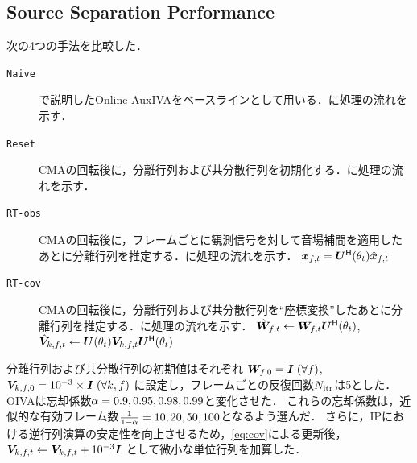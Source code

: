 \documentclass[sip,biber]{now-journal}
\begin{document}
\newcommand{\NaiveIVA}{\texttt{Naive}}
\newcommand{\ResetIVA}{\texttt{Reset}}
\newcommand{\RTCov}{\texttt{RT-cov}}
\newcommand{\RTObs}{\texttt{RT-obs}}
\subsection{Source Separation Performance}

次の4つの手法を比較した．
\begin{description}
  \item[\NaiveIVA] で説明したOnline AuxIVAをベースラインとして用いる．に処理の流れを示す．
  \item[\ResetIVA] CMAの回転後に，分離行列および共分散行列を初期化する．に処理の流れを示す．
  \item[\RTObs] CMAの回転後に，フレームごとに観測信号を対して音場補間を適用したあとに分離行列を推定する．に処理の流れを示す．
    $\Obs _{\ft} = \rotMat ^{\hermite} (\rotSpat _{\tframe}) \rot{\Obs} _{\ft}$
  \item[\RTCov] CMAの回転後に，分離行列および共分散行列を``座標変換''したあとに分離行列を推定する．に処理の流れを示す．
    $\rot{\Demix} _{\ft} \gets \Demix _{\ft} \rotMat ^{\hermite} (\rotSpat _{\tframe})$,\; $\rot{\cov} _{\src,\ft} \gets \rotMat (\rotSpat _{\tframe}) \cov _{\src,\ft} \rotMat ^{\hermite} (\rotSpat _{\tframe})$
\end{description}

分離行列および共分散行列の初期値はそれぞれ
$\bm{W} _{f,0} = \bm{I}\; (\forall f)$, $\bm{V} _{k,f,0} = 10^{-3}\times\bm{I}\; (\forall k, f)$
に設定し，フレームごとの反復回数$N _{\mathrm{itr}}$は5とした．
OIVAは忘却係数$\alpha = 0.9, 0.95, 0.98, 0.99$と変化させた．
これらの忘却係数は，近似的な有効フレーム数$\frac{1}{1 - \alpha} = 10, 20, 50, 100$となるよう選んだ．
さらに，IPにおける逆行列演算の安定性を向上させるため，\eqref{eq:cov}による更新後，
$\cov _{\src,\ft} \gets \cov _{\src,\ft} + 10 ^{-3} \Eye$
として微小な単位行列を加算した．
\end{document}
